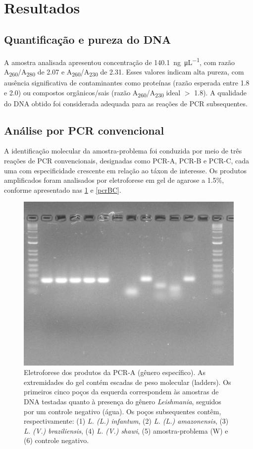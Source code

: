 \section{Resultados}

\subsection{Quantificação e pureza do DNA} 
A amostra analisada apresentou concentração de
\qty{140,1}{\nano\gram\per\micro\liter}, com razão
A\textsubscript{260}/A\textsubscript{280} de \num{2,07} e
A\textsubscript{260}/A\textsubscript{230} de \num{2,31}. Esses valores indicam
alta pureza, com ausência significativa de contaminantes como proteínas (razão
esperada entre \num{1.8} e \num{2.0}) ou compostos orgânicos/sais (razão
A\textsubscript{260}/A\textsubscript{230} ideal \(>\) \num{1.8})\cite{Alguém}. A
qualidade do DNA obtido foi considerada adequada para as reações de PCR
subsequentes.

\subsection{Análise por PCR convencional} A identificação molecular da
amostra-problema foi conduzida por meio de três reações de PCR convencionais,
designadas como PCR-A, PCR-B e PCR-C, cada uma com especificidade crescente em
relação ao táxon de interesse. Os produtos amplificados foram analisados por
eletroforese em gel de agarose a \num{1.5}\%, conforme apresentado nas
\cref{pcrA} e \cref{pcrBC}.

\begin{figure}
 \centering
 \includegraphics[width=.4\textwidth]{fig/pcrA_rflp_g8.jpg}
 \caption{Eletroforese dos produtos da PCR-A (gênero específico). As extremidades do gel contém escadas de peso molecular (ladders). 
 Os primeiros cinco poços da esquerda correspondem às amostras de DNA testadas quanto à presença do gênero \textit{Leishmania}, 
 seguidos por um controle negativo (água). Os poços subsequentes contêm, respectivamente: (1) \textit{L. (L.) infantum}, 
 (2) \textit{L. (L.) amazonensis}, (3) \textit{L. (V.) braziliensis}, (4) \textit{L. (V.) shawi}, (5) amostra-problema (W) e (6) controle negativo.}
 \label{pcrA}
 \end{figure}

